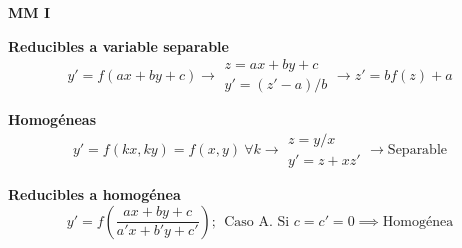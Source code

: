 \documentclass[10pt,landscape,letterpaper]{article}
\begin{document}
\footnotesize

\begin{center}
  {\huge\sffamily\bfseries MM I}\\
\end{center}
\setlength{\premulticols}{0pt}
\setlength{\postmulticols}{0pt}
\setlength{\multicolsep}{1pt}
\setlength{\columnsep}{1.8em}
\begin{multicols}{3}%
\textbf{Reducibles a variable separable}
\vspace{-5pt}
\[y'=f(ax+by+c) \rightarrow \begin{matrix}
  z=ax+by+c \\
  y' = {(z'-a)}/{b}
\end{matrix} \rightarrow z' = bf(z)+a\]

\vspace{-7pt}
\textbf{Homogéneas}
\vspace{-8pt}
\[y'=f(kx,ky)=f(x,y) \ \forall k \rightarrow \begin{matrix}
  z=y/x \\
  y' = z+xz' \end{matrix}  \rightarrow \mbox{Separable}\]

\vspace{-8pt}
\textbf{Reducibles a homogénea}
\vspace{-3pt}
\[y'=f\left(\frac{ax+by+c}{a'x+b'y+c'}\right); \ \ \boxed{\mbox{Caso A. Si } c=c'=0 \implies \mbox{Homogénea}}\]

\fbox{\begin{minipage}{29em}
\vspace{-5pt}
\[\mbox{B. Si } \left|\begin{matrix}
  a & b \\ a' & b'
\end{matrix}\right| \neq 0; \  \left\{\begin{matrix}
  x=\alpha + h \\ y= \beta +k
\end{matrix}\right. \mbox{ : } \frac{ax+by+c}{a'x+b'y+c'} = \frac{a\alpha+b\beta}{a'\alpha+b'\beta} \]\end{minipage}}

\fbox{\begin{minipage}{29em}
\vspace{-5pt}
\[\mbox{C. Si } \left|\begin{matrix}
  a & b \\ a' & b'
\end{matrix}\right| = 0; y'=f\left(\frac{ax+by+c}{d(ax+by)+c'}\right); \begin{matrix}
  z=ax+by \\ \mbox{Sep.}
\end{matrix}\]
\end{minipage}}


\end{multicols}
\end{document}
